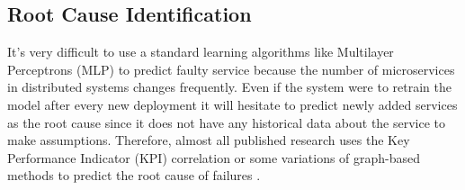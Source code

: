 \subsection{Root Cause Identification}

It's very difficult to use a standard learning algorithms like Multilayer Perceptrons (MLP) to predict faulty service because the number of microservices in distributed systems changes frequently. Even if the system were to retrain the model after every new deployment it will hesitate to predict newly added services as the root cause since it does not have any historical data about the service to make assumptions. Therefore, almost all published research uses the Key Performance Indicator (KPI) correlation or some variations of graph-based methods to predict the root cause of failures \citep{soldani2021anomaly}.

